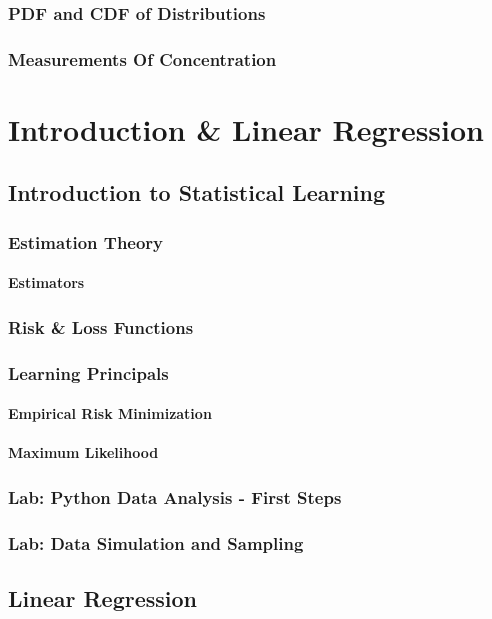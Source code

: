 \documentclass[11pt,fleqn]{book} %
\begin{document}
        \subsection{PDF and CDF of Distributions}
        \subsection{Measurements Of Concentration}

\chapter{Introduction \& Linear Regression}
    \section{Introduction to Statistical Learning}
        \subsection{Estimation Theory}
            \subsubsection{Estimators}
            \subsection{Risk \& Loss Functions}
        \subsection{Learning Principals}
            \subsubsection{Empirical Risk Minimization}
            \subsubsection{Maximum Likelihood}
        \subsection{Lab: Python Data Analysis - First Steps}
        \subsection{Lab: Data Simulation and Sampling}
        
    \section{Linear Regression}
\end{document}
